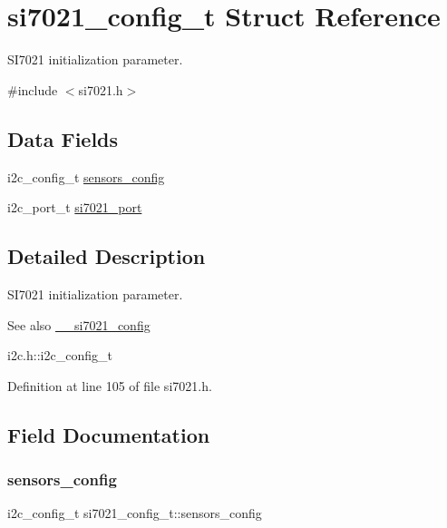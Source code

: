 \hypertarget{structsi7021__config__t}{}\section{si7021\+\_\+config\+\_\+t Struct Reference}
\label{structsi7021__config__t}


S\+I7021 initialization parameter.  




{\ttfamily \#include $<$si7021.\+h$>$}

\subsection*{Data Fields}
\begin{DoxyCompactItemize}
\item 
i2c\+\_\+config\+\_\+t \hyperlink{structsi7021__config__t_a7111e4c680e1eba6473f6a1d72b5456c}{sensors\+\_\+config}
\item 
i2c\+\_\+port\+\_\+t \hyperlink{structsi7021__config__t_ac3b2711d602d8210c52ec5d8680c827f}{si7021\+\_\+port}
\end{DoxyCompactItemize}


\subsection{Detailed Description}
S\+I7021 initialization parameter. 

\begin{DoxySeeAlso}{See also}
\hyperlink{si7021_8c_a7961a32ca6f5fed329358f12119b97b6}{\+\_\+\+\_\+si7021\+\_\+config} 

i2c.\+h\+::i2c\+\_\+config\+\_\+t 
\end{DoxySeeAlso}


Definition at line 105 of file si7021.\+h.



\subsection{Field Documentation}
\mbox{\label{structsi7021__config__t_a7111e4c680e1eba6473f6a1d72b5456c}} 
\subsubsection{\texorpdfstring{sensors\+\_\+config}{sensors\_config}}
{\footnotesize\ttfamily i2c\+\_\+config\+\_\+t si7021\+\_\+config\+\_\+t\+::sensors\+\_\+config}

